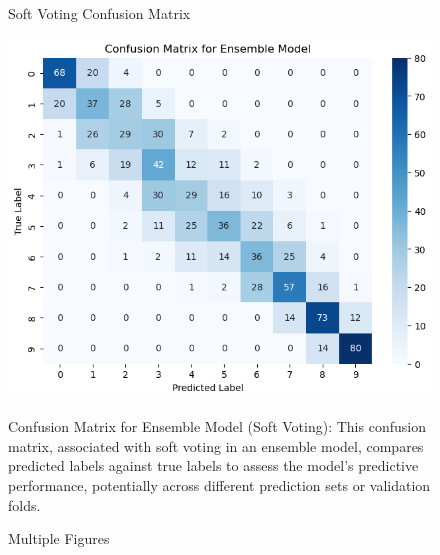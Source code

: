 \documentclass{article}
\begin{document}
\begin{figure}[htbp]
    
    \begin{minipage}{\textwidth}
        \centering
        \caption{Soft Voting Confusion Matrix}
        \includegraphics[scale=0.5]{ConfusionMAtrixSoftClassVoting.png}
    \end{minipage}
    Confusion Matrix for Ensemble Model (Soft Voting): This confusion matrix, associated with soft voting in an ensemble model, compares predicted labels against true labels to assess the model's predictive performance, potentially across different prediction sets or validation folds.
 \caption{Multiple Figures}
\end{figure}
\end{document}
